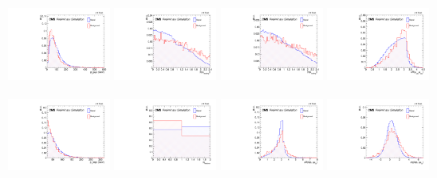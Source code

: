  \begin{figure}[!htb]
      \centering
      \captionsetup{justification=justified}
      \includegraphics[width=0.24\textwidth]{pics/VH_sec/BDT_train_WH/BDT_H_pair_pt.pdf}
      \includegraphics[width=0.24\textwidth]{pics/VH_sec/BDT_train_WH/BDT_muH1_eta_abs.pdf}
      \includegraphics[width=0.24\textwidth]{pics/VH_sec/BDT_train_WH/BDT_muH2_eta_abs.pdf}
      \includegraphics[width=0.24\textwidth]{pics/VH_sec/BDT_train_WH/BDT_muSS_muOS_dR.pdf}
  
      \includegraphics[width=0.24\textwidth]{pics/VH_sec/BDT_train_WH/BDT_lep_pt.pdf}
      \includegraphics[width=0.24\textwidth]{pics/VH_sec/BDT_train_WH/BDT_nEles.pdf}
      \includegraphics[width=0.24\textwidth]{pics/VH_sec/BDT_train_WH/BDT_lep_H_pair_dR.pdf}
      \includegraphics[width=0.24\textwidth]{pics/VH_sec/BDT_train_WH/BDT_lep_H_pair_dEta.pdf}
  

\end{figure}
